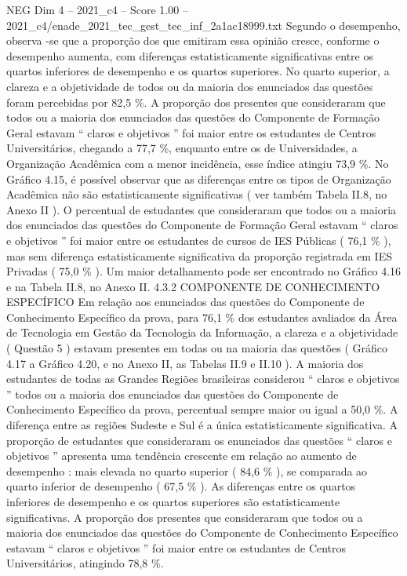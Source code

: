 \begin{textsample}{NEG Dim 4 – 2021\_c4 – Score 1.00 – 2021\_c4/enade\_2021\_tec\_gest\_tec\_inf\_2a1ac18999.txt}
Segundo o desempenho, observa -se que a proporção dos que emitiram essa opinião cresce, conforme o desempenho aumenta, com diferenças estatisticamente significativas entre os quartos inferiores de desempenho e os quartos superiores.
No quarto superior, a clareza e a objetividade de todos ou da maioria dos enunciados das questões foram percebidas por 82,5 \%.
A proporção dos presentes que consideraram que todos ou a maioria dos enunciados das questões do Componente de Formação Geral estavam “ claros e objetivos ” foi maior entre os estudantes de Centros Universitários, chegando a 77,7 \%, enquanto entre os de Universidades, a Organização Acadêmica com a menor incidência, esse índice atingiu 73,9 \%.
No Gráfico 4.15, é possível observar que as diferenças entre os tipos de Organização Acadêmica não são estatisticamente significativas ( ver também Tabela II.8, no Anexo II ).
O percentual de estudantes que consideraram que todos ou a maioria dos enunciados das questões do Componente de Formação Geral estavam “ claros e objetivos ” foi maior entre os estudantes de cursos de IES Públicas ( 76,1 \% ), mas sem diferença estatisticamente significativa da proporção registrada em IES Privadas ( 75,0 \% ).
Um maior detalhamento pode ser encontrado no Gráfico 4.16 e na Tabela II.8, no Anexo II. 4.3.2 COMPONENTE DE CONHECIMENTO ESPECÍFICO Em relação aos enunciados das questões do Componente de Conhecimento Específico da prova, para 76,1 \% dos estudantes avaliados da Área de Tecnologia em Gestão da Tecnologia da Informação, a clareza e a objetividade ( Questão 5 ) estavam presentes em todas ou na maioria das questões ( Gráfico 4.17 a Gráfico 4.20, e no Anexo II, as Tabelas II.9 e II.10 ).
A maioria dos estudantes de todas as Grandes Regiões brasileiras considerou “ claros e objetivos ” todos ou a maioria dos enunciados das questões do Componente de Conhecimento Específico da prova, percentual sempre maior ou igual a 50,0 \%.
A diferença entre as regiões Sudeste e Sul é a única estatisticamente significativa.
A proporção de estudantes que consideraram os enunciados das questões “ claros e objetivos ” apresenta uma tendência crescente em relação ao aumento de desempenho : mais elevada no quarto superior ( 84,6 \% ), se comparada ao quarto inferior de desempenho ( 67,5 \% ).
As diferenças entre os quartos inferiores de desempenho e os quartos superiores são estatisticamente significativas.
A proporção dos presentes que consideraram que todos ou a maioria dos enunciados das questões do Componente de Conhecimento Específico estavam “ claros e objetivos ” foi maior entre os estudantes de Centros Universitários, atingindo 78,8 \%.

\end{textsample}

